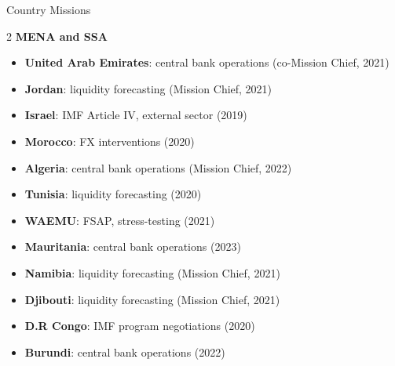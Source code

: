 \documentclass[usegeometry, 10pt, a4paper]{cv} %
\begin{document}
\begin{rubriquetableau}[0.95\textwidth]{Country Missions}
\begin{multicols}{2}
\textbf{\large MENA and SSA}
\begin{itemize}
  \item \textbf{United Arab Emirates}: central bank operations (co-Mission Chief, 2021)
  \item \textbf{Jordan}: liquidity forecasting (Mission Chief, 2021)
  \item \textbf{Israel}: IMF Article IV, external sector (2019)
  \item \textbf{Morocco}: FX interventions (2020)  
  \item \textbf{Algeria}: central bank operations (Mission Chief, 2022)
  \item \textbf{Tunisia}: liquidity forecasting (2020)
  \item \textbf{WAEMU}: FSAP, stress-testing (2021)
  \item \textbf{Mauritania}: central bank operations (2023)
  \item \textbf{Namibia}: liquidity forecasting (Mission Chief, 2021)
  \item \textbf{Djibouti}: liquidity forecasting (Mission Chief, 2021)
  \item \textbf{D.R Congo}: IMF program negotiations (2020)
  \item \textbf{Burundi}: central bank operations (2022)
\end{itemize}

\end{multicols}  
\end{rubriquetableau}
\vspace{0.5cm}
\end{document}
